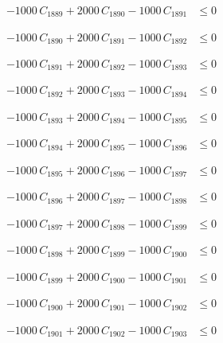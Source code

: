 \documentclass[a4paper,11pt]{article}
\begin{document}
\begin{align}
-1000\,C_{1889} + 2000\,C_{1890} - 1000\,C_{1891} &\leq 0 \nonumber
\end{align}

\begin{align}
-1000\,C_{1890} + 2000\,C_{1891} - 1000\,C_{1892} &\leq 0 \nonumber
\end{align}

\begin{align}
-1000\,C_{1891} + 2000\,C_{1892} - 1000\,C_{1893} &\leq 0 \nonumber
\end{align}

\begin{align}
-1000\,C_{1892} + 2000\,C_{1893} - 1000\,C_{1894} &\leq 0 \nonumber
\end{align}

\begin{align}
-1000\,C_{1893} + 2000\,C_{1894} - 1000\,C_{1895} &\leq 0 \nonumber
\end{align}

\begin{align}
-1000\,C_{1894} + 2000\,C_{1895} - 1000\,C_{1896} &\leq 0 \nonumber
\end{align}

\begin{align}
-1000\,C_{1895} + 2000\,C_{1896} - 1000\,C_{1897} &\leq 0 \nonumber
\end{align}

\begin{align}
-1000\,C_{1896} + 2000\,C_{1897} - 1000\,C_{1898} &\leq 0 \nonumber
\end{align}

\begin{align}
-1000\,C_{1897} + 2000\,C_{1898} - 1000\,C_{1899} &\leq 0 \nonumber
\end{align}

\begin{align}
-1000\,C_{1898} + 2000\,C_{1899} - 1000\,C_{1900} &\leq 0 \nonumber
\end{align}

\begin{align}
-1000\,C_{1899} + 2000\,C_{1900} - 1000\,C_{1901} &\leq 0 \nonumber
\end{align}

\begin{align}
-1000\,C_{1900} + 2000\,C_{1901} - 1000\,C_{1902} &\leq 0 \nonumber
\end{align}

\begin{align}
-1000\,C_{1901} + 2000\,C_{1902} - 1000\,C_{1903} &\leq 0 \nonumber
\end{align}
\end{document}
